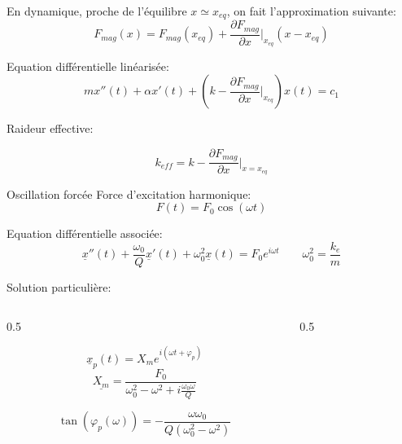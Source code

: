 \documentclass{beamer}
\begin{document}
\begin{frame}{}
    En dynamique, proche de l'équilibre $x\simeq x_{eq}$, on fait l'approximation suivante:
    \[
    F_{mag}(x) = F_{mag}(x_{eq}) + \frac{\partial F_{mag}}{\partial x}\bigg|_{x_{eq}} (x - x_{eq})
    \]

    Equation différentielle linéarisée:
    \[
    m x''(t) + \alpha x'(t) + \left(k-\frac{\partial F_{mag}}{\partial x}\bigg|_{x_{eq}}\right) x(t) = c_1
    \]

    Raideur effective:

    \[
    \boxed{k_{eff} = k - \frac{\partial F_{mag}}{\partial x}\bigg|_{x=x_{eq}}}
    \]

\end{frame}


\begin{frame}{Oscillation forcée}
    Force d'excitation harmonique:
    \[
    F(t) = F_0 \cos(\omega t)
    \]

    Equation différentielle associée:
    \[
    \underline {x}''(t) + \frac{\omega_0}{Q} \underline {x}'(t) + \omega_0^2 \underline {x}(t) = F_0 e^{i\omega t} \qquad \omega_0^2 = \frac{k_{e}}{m}
    \]

    Solution particulière:

    \begin{columns}
        \begin{column}{0.5\textwidth}

    \[
    \underline x_p(t) = X_m e^{i(\omega t + \varphi_p)}
    \]
    \[
    \underline{X_m} = \frac{F_0}{\omega_0^2 - \omega^2 + i\frac{\omega_0 \omega}{Q}}
    \]

    \[
    \tan(\varphi_p(\omega)) = -\frac{\omega \omega_0}{Q(\omega_0^2 - \omega^2)}
    \]
        \end{column}
        \begin{column}{0.5\textwidth}
\end{column}
\end{columns}
\end{frame}
\end{document}
